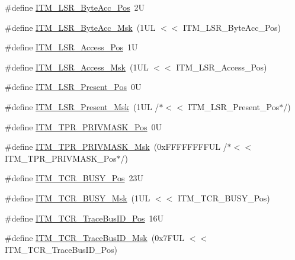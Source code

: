 \begin{DoxyCompactItemize}
\item 
\#define \hyperlink{group___c_m_s_i_s___i_t_m_gabfae3e570edc8759597311ed6dfb478e}{I\+T\+M\+\_\+\+L\+S\+R\+\_\+\+Byte\+Acc\+\_\+\+Pos}~2U
\item 
\#define \hyperlink{group___c_m_s_i_s___i_t_m_ga91f492b2891bb8b7eac5b58de7b220f4}{I\+T\+M\+\_\+\+L\+S\+R\+\_\+\+Byte\+Acc\+\_\+\+Msk}~(1\+U\+L $<$$<$ I\+T\+M\+\_\+\+L\+S\+R\+\_\+\+Byte\+Acc\+\_\+\+Pos)
\item 
\#define \hyperlink{group___c_m_s_i_s___i_t_m_ga144a49e12b83ad9809fdd2769094fdc0}{I\+T\+M\+\_\+\+L\+S\+R\+\_\+\+Access\+\_\+\+Pos}~1U
\item 
\#define \hyperlink{group___c_m_s_i_s___i_t_m_gac8ae69f11c0311da226c0c8ec40b3d37}{I\+T\+M\+\_\+\+L\+S\+R\+\_\+\+Access\+\_\+\+Msk}~(1\+U\+L $<$$<$ I\+T\+M\+\_\+\+L\+S\+R\+\_\+\+Access\+\_\+\+Pos)
\item 
\#define \hyperlink{group___c_m_s_i_s___i_t_m_gaf5740689cf14564d3f3fd91299b6c88d}{I\+T\+M\+\_\+\+L\+S\+R\+\_\+\+Present\+\_\+\+Pos}~0U
\item 
\#define \hyperlink{group___c_m_s_i_s___i_t_m_gaa5bc2a7f5f1d69ff819531f5508bb017}{I\+T\+M\+\_\+\+L\+S\+R\+\_\+\+Present\+\_\+\+Msk}~(1\+U\+L /$\ast$$<$$<$ I\+T\+M\+\_\+\+L\+S\+R\+\_\+\+Present\+\_\+\+Pos$\ast$/)
\item 
\#define \hyperlink{group___c_m_s_i_s___i_t_m_ga7abe5e590d1611599df87a1884a352e8}{I\+T\+M\+\_\+\+T\+P\+R\+\_\+\+P\+R\+I\+V\+M\+A\+S\+K\+\_\+\+Pos}~0U
\item 
\#define \hyperlink{group___c_m_s_i_s___i_t_m_ga168e089d882df325a387aab3a802a46b}{I\+T\+M\+\_\+\+T\+P\+R\+\_\+\+P\+R\+I\+V\+M\+A\+S\+K\+\_\+\+Msk}~(0x\+F\+F\+F\+F\+F\+F\+F\+F\+U\+L /$\ast$$<$$<$ I\+T\+M\+\_\+\+T\+P\+R\+\_\+\+P\+R\+I\+V\+M\+A\+S\+K\+\_\+\+Pos$\ast$/)
\item 
\#define \hyperlink{group___c_m_s_i_s___i_t_m_ga9174ad4a36052c377cef4e6aba2ed484}{I\+T\+M\+\_\+\+T\+C\+R\+\_\+\+B\+U\+S\+Y\+\_\+\+Pos}~23U
\item 
\#define \hyperlink{group___c_m_s_i_s___i_t_m_ga43ad7cf33de12f2ef3a412d4f354c60f}{I\+T\+M\+\_\+\+T\+C\+R\+\_\+\+B\+U\+S\+Y\+\_\+\+Msk}~(1\+U\+L $<$$<$ I\+T\+M\+\_\+\+T\+C\+R\+\_\+\+B\+U\+S\+Y\+\_\+\+Pos)
\item 
\#define \hyperlink{group___c_m_s_i_s___i_t_m_gaca0281de867f33114aac0636f7ce65d3}{I\+T\+M\+\_\+\+T\+C\+R\+\_\+\+Trace\+Bus\+I\+D\+\_\+\+Pos}~16U
\item 
\#define \hyperlink{group___c_m_s_i_s___i_t_m_ga60c20bd9649d1da5a2be8e656ba19a60}{I\+T\+M\+\_\+\+T\+C\+R\+\_\+\+Trace\+Bus\+I\+D\+\_\+\+Msk}~(0x7\+F\+U\+L $<$$<$ I\+T\+M\+\_\+\+T\+C\+R\+\_\+\+Trace\+Bus\+I\+D\+\_\+\+Pos)

\end{DoxyCompactItemize}

